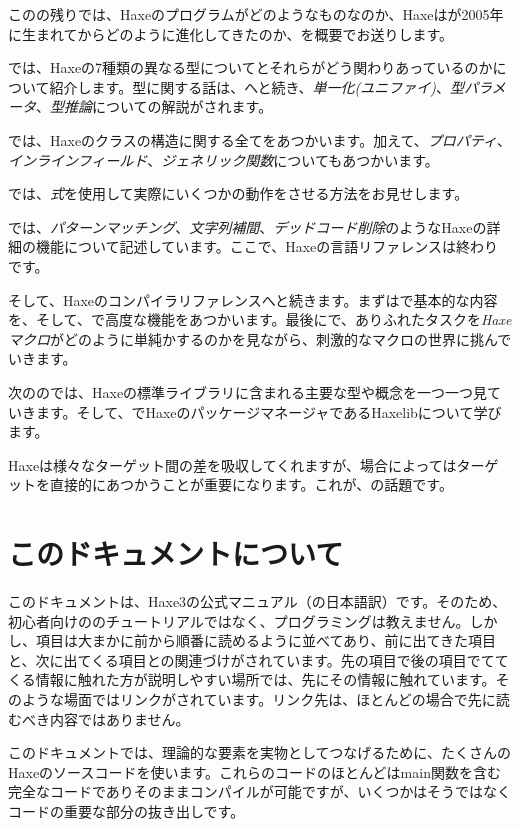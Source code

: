 このの残りでは、Haxeのプログラムがどのようなものなのか、Haxeはが2005年に生まれてからどのように進化してきたのか、を概要でお送りします。

では、Haxeの7種類の異なる型についてとそれらがどう関わりあっているのかについて紹介します。型に関する話は、へと続き、\emph{単一化(ユニファイ)}、\emph{型パラメータ}、\emph{型推論}についての解説がされます。

では、Haxeのクラスの構造に関する全てをあつかいます。加えて、\emph{プロパティ}、\emph{インラインフィールド}、\emph{ジェネリック関数}についてもあつかいます。

では、\emph{式}を使用して実際にいくつかの動作をさせる方法をお見せします。

では、\emph{パターンマッチング}、\emph{文字列補間}、\emph{デッドコード削除}のようなHaxeの詳細の機能について記述しています。ここで、Haxeの言語リファレンスは終わりです。

そして、Haxeのコンパイラリファレンスへと続きます。まずはで基本的な内容を、そして、で高度な機能をあつかいます。最後にで、ありふれたタスクを\emph{Haxeマクロ}がどのように単純かするのかを見ながら、刺激的なマクロの世界に挑んでいきます。

次ののでは、Haxeの標準ライブラリに含まれる主要な型や概念を一つ一つ見ていきます。そして、でHaxeのパッケージマネージャであるHaxelibについて学びます。

Haxeは様々なターゲット間の差を吸収してくれますが、場合によってはターゲットを直接的にあつかうことが重要になります。これが、の話題です。

\section{このドキュメントについて}
\label{introduction-about-this-document}

このドキュメントは、Haxe3の公式マニュアル（の日本語訳）です。そのため、初心者向けののチュートリアルではなく、プログラミングは教えません。しかし、項目は大まかに前から順番に読めるように並べてあり、前に出てきた項目と、次に出てくる項目との関連づけがされています。先の項目で後の項目でててくる情報に触れた方が説明しやすい場所では、先にその情報に触れています。そのような場面ではリンクがされています。リンク先は、ほとんどの場合で先に読むべき内容ではありません。

このドキュメントでは、理論的な要素を実物としてつなげるために、たくさんのHaxeのソースコードを使います。これらのコードのほとんどはmain関数を含む完全なコードでありそのままコンパイルが可能ですが、いくつかはそうではなくコードの重要な部分の抜き出しです。

